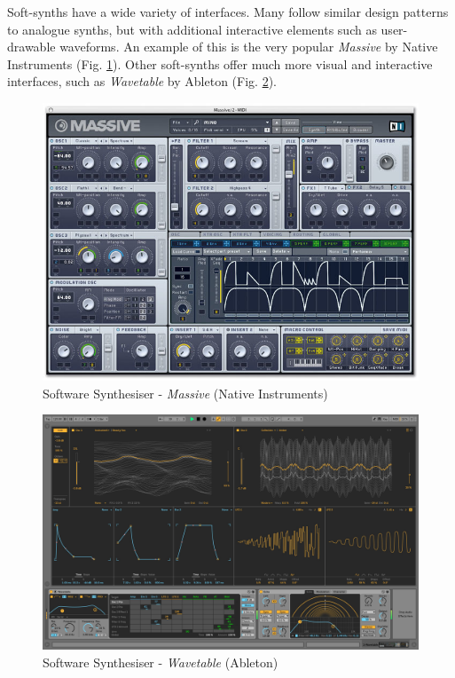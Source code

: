 \documentclass[11pt, oneside]{report}   	%
\begin{document}
Soft-synths have a wide variety of interfaces. Many follow similar design patterns to analogue synths, but with additional interactive elements such as user-drawable waveforms. An example of this is the very popular \emph{Massive} by Native Instruments \cite{Massive} (Fig. \ref{fig:MassiveNI}). Other soft-synths offer much more visual and interactive interfaces, such as \emph{Wavetable} by Ableton \cite{Wavetable} (Fig. \ref{fig:AbletonWavetable}).

\begin{figure}[h] 
	\centering
	\includegraphics[width = 5in]{MassiveNI.jpg}
	\vspace{-5pt}
	\caption{Software Synthesiser - \emph{Massive} (Native Instruments) \cite{Massive}}
	\label{fig:MassiveNI}
	\vspace{-10pt}
\end{figure}

\begin{figure}[h] 
	\centering
	\includegraphics[width = 5in]{AbletonWavetable.jpg}
	\caption{Software Synthesiser - \emph{Wavetable} (Ableton)\cite{Wavetable} }
	\label{fig:AbletonWavetable}
\end{figure}
\end{document}
